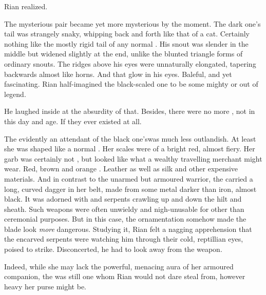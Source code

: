 \new
{} Rian realized. 

The mysterious pair became yet more mysterious by the moment. The dark one's tail was strangely snaky, whipping back and forth like that of a cat. Certainly nothing like the mostly rigid tail of any normal \scatha. His snout was slender in the middle but widened slightly at the end, unlike the blunted triangle forms of ordinary \scathaese{} snouts. The ridges above his eyes were unnaturally elongated, tapering backwards almost like horns. And that glow in his eyes. Baleful, and yet fascinating. Rian half-imagined the black-scaled one to be some mighty \dragon{} or \daemon{} out of legend. 

He laughed inside at the absurdity of that. 
Besides, there were no more \dragons{}, not in this day and age. 
If they ever existed at all. 

The \sphyle\dash evidently an attendant of the black one's\dash was much less outlandish. At least she was shaped like a normal \scatha. Her scales were of a bright red, almost fiery. Her garb was certainly not \Malcuric, but looked like what a wealthy travelling merchant might wear. Red, brown and orange \colours. Leather as well as silk and other expensive materials. And in contrast to the unarmed but armoured warrior, the \sphyle{} carried a long, curved dagger in her belt, made from some metal darker than iron, almost black. 
It was adorned with \dragons{} and serpents crawling up and down the hilt and sheath. Such weapons were often unwieldy and nigh-unusable for other than ceremonial purposes. But in this case, the ornamentation somehow made the blade look \emph{more} dangerous. %
Studying it, Rian felt a nagging apprehension that the encarved serpents were watching him through their cold, reptillian eyes, poised to strike. Disconcerted, he had to look away from the weapon. 

Indeed, while she may lack the powerful, menacing aura of her armoured companion, the \sphyle{} was still one whom Rian would not dare steal from, however heavy her purse might be. 

